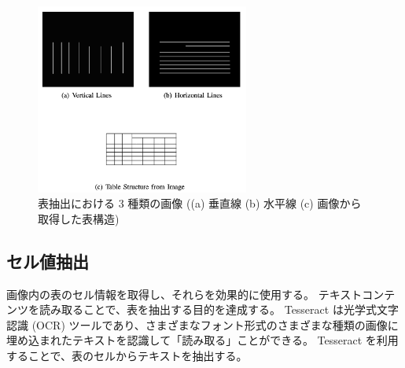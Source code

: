 \documentclass[uplatex, twocolumn,10pt]{jsarticle}
\begin{document}
\begin{figure}[tp]
    \begin{center}
        \includegraphics*[width=7cm]{image/master/master2/Fig3.png}
        \caption{表抽出における 3 種類の画像 ((a) 垂直線 (b) 水平線 (c) 画像から取得した表構造)}
        \label{fig3}
    \end{center}
\end{figure}

\subsection{セル値抽出}
画像内の表のセル情報を取得し、それらを効果的に使用する。
テキストコンテンツを読み取ることで、表を抽出する目的を達成する。
Tesseract は光学式文字認識 (OCR) ツールであり、さまざまなフォント形式のさまざまな種類の画像に埋め込まれたテキストを認識して「読み取る」ことができる\cite{bib25}。
Tesseract を利用することで、表のセルからテキストを抽出する。
\end{document}
